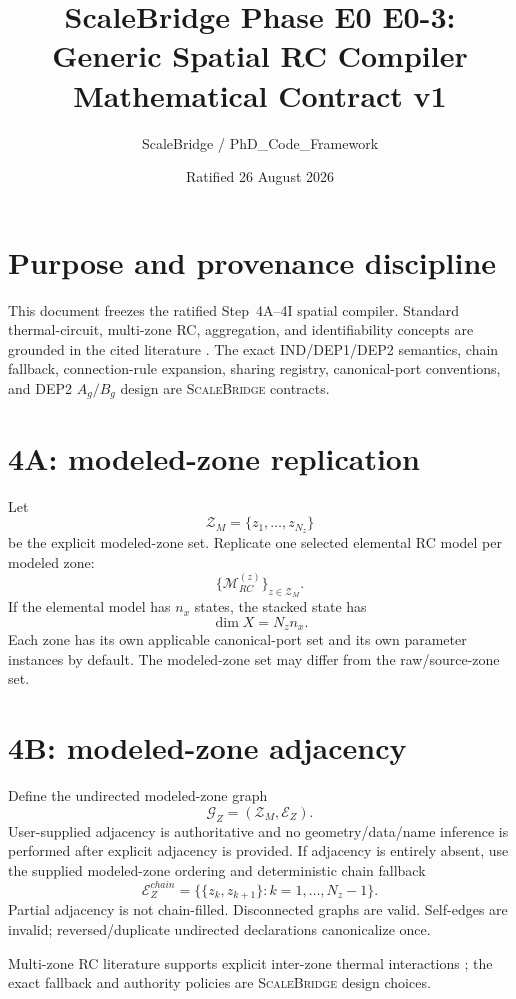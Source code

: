 \documentclass[11pt]{article}
\title{ScaleBridge Phase E0 E0-3: Generic Spatial RC Compiler Mathematical Contract v1}
\author{ScaleBridge / PhD\_Code\_Framework}
\date{Ratified 26 August 2026}
\newcommand{\ScaleBridge}{\textsc{ScaleBridge}}
\begin{document}
\maketitle

\section{Purpose and provenance discipline}
This document freezes the ratified Step~4A--4I spatial compiler.  Standard thermal-circuit, multi-zone RC, aggregation, and identifiability concepts are grounded in the cited literature \citep{GhiausAhmad2020ThermalCircuits,DengGoyalBarooahMehta2014StructurePreserving,GuoCoffmanMunkEtAl2021Aggregation,ArroyoSpiessensHelsen2020MultiZoneGreyBox}.  The exact IND/DEP1/DEP2 semantics, chain fallback, connection-rule expansion, sharing registry, canonical-port conventions, and DEP2 $A_g/B_g$ design are \ScaleBridge{} contracts.

\section{4A: modeled-zone replication}
Let
\[
\mathcal Z_M=\{z_1,\ldots,z_{N_z}\}
\]
be the explicit modeled-zone set.  Replicate one selected elemental RC model per modeled zone:
\[
\{\mathcal M_{RC}^{(z)}\}_{z\in\mathcal Z_M}.
\]
If the elemental model has $n_x$ states, the stacked state has
\[
\dim X=N_zn_x.
\]
Each zone has its own applicable canonical-port set and its own parameter instances by default.  The modeled-zone set may differ from the raw/source-zone set.

\section{4B: modeled-zone adjacency}
Define the undirected modeled-zone graph
\[
\mathcal G_Z=(\mathcal Z_M,\mathcal E_Z).
\]
User-supplied adjacency is authoritative and no geometry/data/name inference is performed after explicit adjacency is provided.  If adjacency is entirely absent, use the supplied modeled-zone ordering and deterministic chain fallback
\[
\mathcal E_Z^{chain}=\{\{z_k,z_{k+1}\}:k=1,\ldots,N_z-1\}.
\]
Partial adjacency is not chain-filled.  Disconnected graphs are valid. Self-edges are invalid; reversed/duplicate undirected declarations canonicalize once.

Multi-zone RC literature supports explicit inter-zone thermal interactions \citep{ArroyoSpiessensHelsen2020MultiZoneGreyBox,WangChenLi2019RCSimplification,BelicSliskovicHocenski2021MultiZoneRC}; the exact fallback and authority policies are \ScaleBridge{} design choices.
\end{document}
